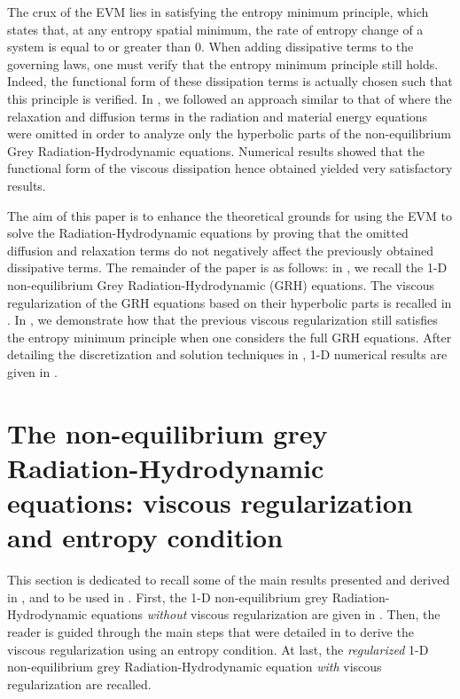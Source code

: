 \documentclass[review]{elsarticle}
\begin{document}
The crux of the EVM lies in satisfying the entropy minimum principle, which states that, at any entropy spatial minimum, the rate of entropy change of a system is equal to or greater than 0. When
adding dissipative terms to the governing laws, one must verify that the entropy minimum principle still holds. Indeed, the functional form of these dissipation terms
is actually chosen such that this principle is verified. In \cite{our_jcp_radhy_paper}, we followed an approach similar to that of \cite{Balsara, LowrieMorel} 
where the relaxation and diffusion terms in the radiation and material energy equations were omitted in order to analyze only the hyperbolic parts of 
the non-equilibrium Grey Radiation-Hydrodynamic equations. Numerical results showed that the functional form of the viscous dissipation hence obtained 
yielded very satisfactory results. 

The aim of this paper is to enhance the theoretical grounds for using the EVM to solve the  Radiation-Hydrodynamic equations by proving that the omitted diffusion
and relaxation terms do not negatively affect the previously obtained dissipative terms. The remainder of the paper is as follows: in , we recall
the 1-D non-equilibrium Grey Radiation-Hydrodynamic (GRH) equations. The viscous regularization of the GRH equations based on their hyperbolic parts is recalled in .
In , we demonstrate how that the previous viscous regularization still satisfies the entropy minimum principle when one considers the full GRH equations.
After detailing the discretization and solution techniques in , 1-D numerical results are given in .
%
\section{The non-equilibrium grey Radiation-Hydrodynamic equations: viscous regularization and entropy condition}\label{sec:GRH}
%
This section is dedicated to recall some of the main results presented and derived in \cite{our_jcp_radhy_paper}, and to be used in . First, the 1-D  non-equilibrium grey Radiation-Hydrodynamic equations \emph{without} viscous regularization are given in . Then, the reader is guided through the main steps that were detailed in \cite{our_jcp_radhy_paper} to derive the viscous regularization using an entropy condition. At last, the \emph{regularized} 1-D non-equilibrium grey Radiation-Hydrodynamic equation \emph{with} viscous regularization are recalled.
\end{document}
